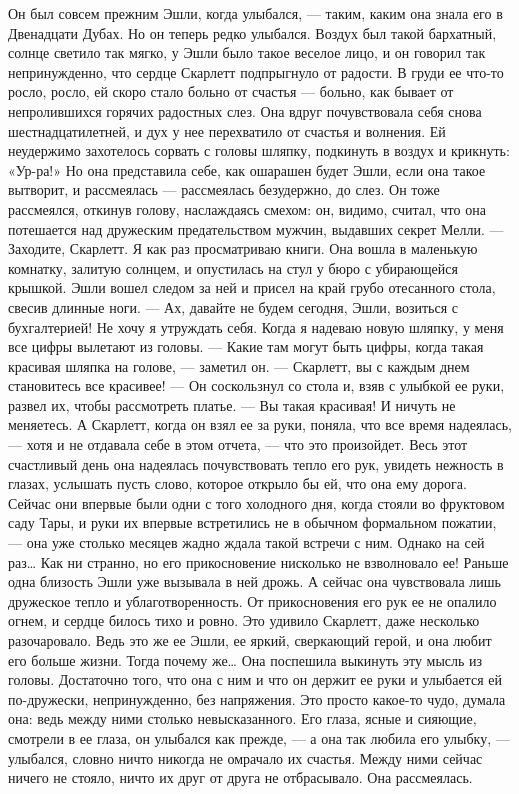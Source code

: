 Он был совсем прежним Эшли, когда улыбался, — таким, каким она знала его в Двенадцати Дубах. Но он теперь редко улыбался. Воздух был такой бархатный, солнце светило так мягко, у Эшли было такое веселое лицо, и он говорил так непринужденно, что сердце Скарлетт подпрыгнуло от радости. В груди ее что-то росло, росло, ей скоро стало больно от счастья — больно, как бывает от непролившихся горячих радостных слез. Она вдруг почувствовала себя снова шестнадцатилетней, и дух у нее перехватило от счастья и волнения. Ей неудержимо захотелось сорвать с головы шляпку, подкинуть в воздух и крикнуть: «Ур-ра!» Но она представила себе, как ошарашен будет Эшли, если она такое вытворит, и рассмеялась — рассмеялась безудержно, до слез. Он тоже рассмеялся, откинув голову, наслаждаясь смехом: он, видимо, считал, что она потешается над дружеским предательством мужчин, выдавших секрет Мелли.
— Заходите, Скарлетт. Я как раз просматриваю книги. Она вошла в маленькую комнатку, залитую солнцем, и опустилась на стул у бюро с убирающейся крышкой. Эшли вошел следом за ней и присел на край грубо отесанного стола, свесив длинные ноги.
— Ах, давайте не будем сегодня, Эшли, возиться с бухгалтерией! Не хочу я утруждать себя. Когда я надеваю новую шляпку, у меня все цифры вылетают из головы.
— Какие там могут быть цифры, когда такая красивая шляпка на голове, — заметил он. — Скарлетт, вы с каждым днем становитесь все красивее! — Он соскользнул со стола и, взяв с улыбкой ее руки, развел их, чтобы рассмотреть платье. — Вы такая красивая! И ничуть не меняетесь.
А Скарлетт, когда он взял ее за руки, поняла, что все время надеялась, — хотя и не отдавала себе в этом отчета, — что это произойдет. Весь этот счастливый день она надеялась почувствовать тепло его рук, увидеть нежность в глазах, услышать пусть слово, которое открыло бы ей, что она ему дорога. Сейчас они впервые были одни с того холодного дня, когда стояли во фруктовом саду Тары, и руки их впервые встретились не в обычном формальном пожатии, — она уже столько месяцев жадно ждала такой встречи с ним. Однако на сей раз…
Как ни странно, но его прикосновение нисколько не взволновало ее! Раньше одна близость Эшли уже вызывала в ней дрожь. А сейчас она чувствовала лишь дружеское тепло и ублаготворенность. От прикосновения его рук ее не опалило огнем, и сердце билось тихо и ровно. Это удивило Скарлетт, даже несколько разочаровало. Ведь это же ее Эшли, ее яркий, сверкающий герой, и она любит его больше жизни. Тогда почему же…
Она поспешила выкинуть эту мысль из головы. Достаточно того, что она с ним и что он держит ее руки и улыбается ей по-дружески, непринужденно, без напряжения. Это просто какое-то чудо, думала она: ведь между ними столько невысказанного. Его глаза, ясные и сияющие, смотрели в ее глаза, он улыбался как прежде, — а она так любила его улыбку, — улыбался, словно ничто никогда не омрачало их счастья. Между ними сейчас ничего не стояло, ничто их друг от друга не отбрасывало. Она рассмеялась.

